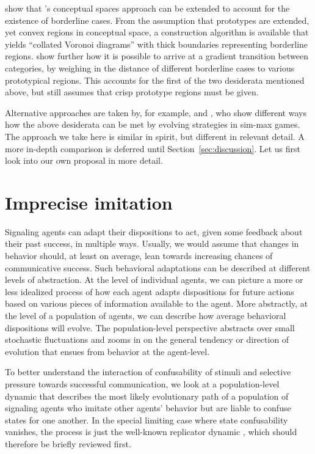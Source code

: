 \documentclass[fleqn,reqno,10pt]{article}
\begin{document}
\citet{DouvenDecock2011:Vagueness:-A-Co} show that
\citeauthor{Gardenfors2000:Conceptual-Spac}'s conceptual spaces
approach can be extended to account for the existence of borderline
cases. From the assumption that prototypes are extended, yet convex
regions in conceptual space, a construction algorithm is available
that yields ``collated Voronoi diagrams'' with thick boundaries
representing borderline
regions. \citet{DecockDouven2012:What-is-Graded-} show further how it
is possible to arrive at a gradient transition between categories, by
weighing in the distance of different borderline cases to various
prototypical regions. This accounts for the first of the two
desiderata mentioned above, but still assumes that crisp prototype
regions must be given.

Alternative approaches are taken by, for example, \citet{FrankeJager2010:Vagueness-Signa} and
\citet{OConnor2013:The-Evolution-o}, who show different ways how the above desiderata can be met by evolving
strategies in sim-max games. The approach we take here is similar in spirit, but different in
relevant detail. A more in-depth comparison is deferred until Section~\ref{sec:discussion}. Let
us first look into our own proposal in more detail.



\section{Imprecise imitation}
\label{sec:repl-diff-dynam}

Signaling agents can adapt their dispositions to act, given some feedback about their past
success, in multiple ways. Usually, we would assume that changes in behavior should, at least
on average, lean towards increasing chances of communicative success. Such behavioral
adaptations can be described at different levels of abstraction. At the level of individual
agents, we can picture a more or less idealized process of how each agent adapts dispositions
for future actions based on various pieces of information available to the agent. More
abstractly, at the level of a population of agents, we can describe how average behavioral
dispositions will evolve. The population-level perspective abstracts over small stochastic
fluctuations and zooms in on the general tendency or direction of evolution that ensues from
behavior at the agent-level.

To better understand the interaction of confusability of stimuli and selective pressure towards
successful communication, we look at a population-level dynamic that describes the most likely
evolutionary path of a population of signaling agents who imitate other agents' behavior but
are liable to confuse states for one another. In the special limiting case where state
confusability vanishes, the process is just the well-known replicator dynamic
\citep{TaylorJonker1978:Evolutionary-St}, which should therefore be briefly reviewed first.
\end{document}

